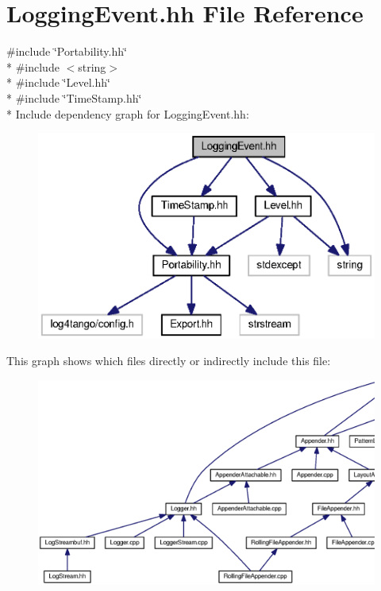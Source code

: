\section{Logging\-Event.\-hh File Reference}
\label{LoggingEvent_8hh}
{\ttfamily \#include \char`\"{}Portability.\-hh\char`\"{}}\\*
{\ttfamily \#include $<$string$>$}\\*
{\ttfamily \#include \char`\"{}Level.\-hh\char`\"{}}\\*
{\ttfamily \#include \char`\"{}Time\-Stamp.\-hh\char`\"{}}\\*
Include dependency graph for Logging\-Event.\-hh\-:
\nopagebreak
\begin{figure}[H]
\begin{center}
\leavevmode
\includegraphics[width=350pt]{db/d40/LoggingEvent_8hh__incl}
\end{center}
\end{figure}
This graph shows which files directly or indirectly include this file\-:
\nopagebreak
\begin{figure}[H]
\begin{center}
\leavevmode
\includegraphics[width=350pt]{d5/d7f/LoggingEvent_8hh__dep__incl}
\end{center}
\end{figure}
